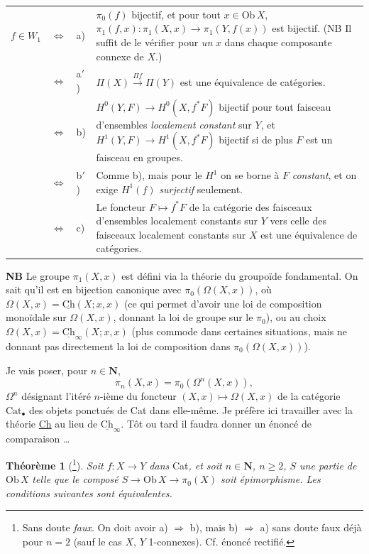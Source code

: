 \documentclass[11pt]{article}
\newcommand{\printedpage}[1]{\marginpar{\footnotesize p.~#1}}
\newcommand{\msp}[1]{\marginpar{\footnotesize [#1]}}
\newcommand{\Ch}{\underline{\mathrm{Ch}}}
\newcommand{\Ob}{\mathrm{Ob}\,}
\begin{document}
\noindent\begin{tabular}{@{}l c l >{\RaggedRight\arraybackslash}p{}@{}}
$f \in W_1$ & $\Longleftrightarrow$ & a) & $\pi_0(f)$ bijectif, et pour tout $x \in \Ob X$, $\pi_1(f,x) : \pi_1(X,x) \longrightarrow \pi_1(Y,f(x))$ est bijectif. (NB Il suffit de le vérifier pour \textit{un} $x$ dans chaque composante connexe de $X$.)\\
 & $\Longleftrightarrow$ & a$'$) & $\Pi(X) \xrightarrow{\Pi f} \Pi(Y)$ est une équivalence de catégories.\\
 & $\Longleftrightarrow$ & b) & $H^0(Y,F) \longrightarrow H^0(X,f^*F)$ bijectif pour tout faisceau d'ensembles \textit{localement constant} sur $Y$, et $H^1(Y,F) \longrightarrow H^1(X,f^*F)$ bijectif si de plus $F$ est un faisceau en groupes.\\
 & $\Longleftrightarrow$ & b$'$) & Comme b), mais pour le $H^1$ on se borne à $F$ \textit{constant}, et on exige $H^1(f)$ \textit{surjectif} seulement.\\
 & $\Longleftrightarrow$ & c) & Le foncteur $F \longmapsto f^*F$ de la catégorie des faisceaux d'ensembles localement constants sur $Y$ vers celle des faisceaux localement constants sur $X$ est une équivalence de catégories.
\end{tabular}

\clearpage

\printedpage{116}

\msp{page 172}

\textbf{NB} Le groupe $\pi_1(X,x)$ est défini via la théorie du groupoïde fondamental. On sait qu'il est en bijection canonique avec $\pi_0(\Omega(X,x))$, où $\Omega(X,x) = \Ch(X;x,x)$ (ce qui permet d'avoir une loi de composition monoïdale sur $\Omega(X,x)$, donnant la loi de groupe sur le $\pi_0$), ou au choix $\Omega(X,x) = \Ch_\infty(X;x,x)$ (plus commode dans certaines situations, mais ne donnant pas directement la loi de composition dans $\pi_0(\Omega(X,x))$).

Je vais poser, pour $n \in \mathbf{N}$,
\[
\pi_n(X,x) = \pi_0(\Omega^n(X,x)),
\]
$\Omega^n$ désignant l'itéré $n$-ième du foncteur $(X,x) \longmapsto \Omega(X,x)$ de la catégorie $\mathrm{Cat}_\bullet$ des objets ponctués de Cat dans elle-même. Je préfère ici travailler avec la théorie \underline{Ch} au lieu de $\Ch_\infty$. Tôt ou tard il faudra donner un énoncé de comparaison \dots

\textbf{Théorème 1} (\footnote[112]{Sans doute \textit{faux}. On doit avoir a) $\Longrightarrow$ b), mais b) $\Longrightarrow$ a) sans doute faux déjà pour $n = 2$ (sauf le cas $X$, $Y$ 1-connexes). Cf. énoncé rectifié.}). \textit{Soit $f : X \longrightarrow Y$ dans} Cat\textit{, et soit $n \in \mathbf{N}$, $n \geq 2$, $S$ une partie de} $\Ob X$ \textit{telle que le composé $S \longrightarrow \Ob X \longrightarrow \pi_0(X)$ soit} \textit{épimorphisme. Les conditions suivantes sont équivalentes.}
\end{document}
